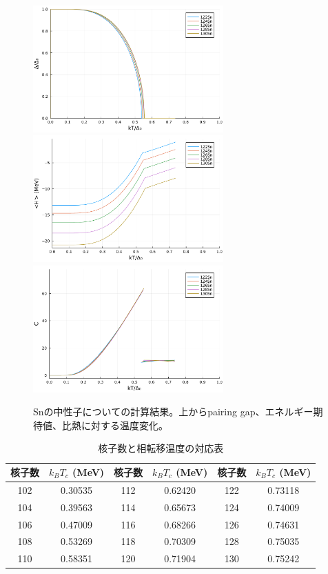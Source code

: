 \documentclass[a4paper,11pt]{jsreport}
\begin{document}
  \begin{figure}[H]
    \centering
    \includegraphics[width=0.65\textwidth]{main_fig/122d.pdf}
    \includegraphics[width=0.65\textwidth]{main_fig/122H.pdf}
    \includegraphics[width=0.65\textwidth]{main_fig/122C.pdf}
    \caption{Snの中性子についての計算結果。上からpairing gap、エネルギー期待値、比熱に対する温度変化。}
  \end{figure}
  \begin{table}[H]
    \centering
    \caption{核子数と相転移温度の対応表}
    \label{tab:transition_temperature}
    \begin{tabular}{cccccc}
        \toprule
        核子数 & $k_B T_c$ (MeV) & 核子数 & $k_B T_c$ (MeV) & 核子数 & $k_B T_c$ (MeV) \\
        \midrule
        102 & 0.30535 & 112 & 0.62420 & 122 & 0.73118 \\
        104 & 0.39563 & 114 & 0.65673 & 124 & 0.74009 \\
        106 & 0.47009 & 116 & 0.68266 & 126 & 0.74631 \\
        108 & 0.53269 & 118 & 0.70309 & 128 & 0.75035 \\
        110 & 0.58351 & 120 & 0.71904 & 130 & 0.75242 \\
        \bottomrule
    \end{tabular}
  \end{table}
\end{document}
